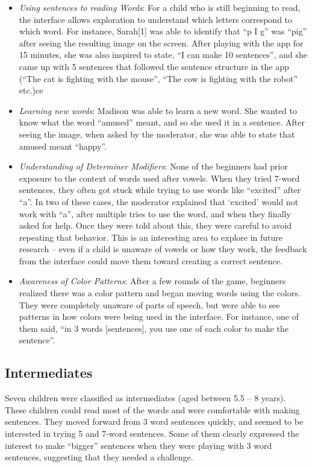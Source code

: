 \documentclass{sigchi-ext}
\begin{document}
\begin{itemize}\compresslist
\item 
\emph {Using sentences to reading Words}: For a child who is still beginning to read, the interface allows exploration to understand which letters correspond to which word. For instance, Sarah[1] was able to identify that ``p I g'' was ``pig'' after seeing the resulting image on the screen.  After playing with the app for 15 minutes, she was also inspired to state, ``I can make 10 sentences'', and she came up with 5 sentences that followed the sentence structure in the app (``The cat is fighting with the mouse'', ``The cow is fighting with the robot'' etc.)ce
\item 	
\emph {Learning new words}: Madison was able to learn a new word. She wanted to know what the word ``amused'' meant, and so she used it in a sentence. After seeing the image, when asked by the moderator, she was able to state that amused meant ``happy''.
\item 	
\emph {Understanding of Determiner Modifiers}: None of the beginners had prior exposure to the context of words used after vowels. When they tried 7-word sentences, they often got stuck while trying to use words like ``excited'' after ``a''. In two of these cases, the moderator explained that ‘excited’ would not work with ``a'', after multiple tries to use the word, and when they finally asked for help. Once they were told about this, they were careful to avoid repeating that behavior. This is an interesting area to explore in future research – even if a child is unaware of vowels or how they work, the feedback from the interface could move them toward creating a correct sentence.
\item 	
\emph {Awareness of Color Patterns}: After a few rounds of the game, beginners realized there was a color pattern and began moving words using the colors. They were completely unaware of parts of speech, but were able to see patterns in how colors were being used in the interface. For instance, one of them said, ``in 3 words [sentences], you use one of each color to make the sentence''.
\end{itemize}

\subsection{Intermediates}
Seven children were classified as intermediates (aged between 5.5 – 8 years).  These children could read most of the words and were comfortable with making sentences. They moved forward from 3 word sentences quickly, and seemed to be interested in trying 5 and 7-word sentences. Some of them clearly expressed the interest to make ``bigger'' sentences when they were playing with 3 word sentences, suggesting that they needed a challenge.
\end{document}
